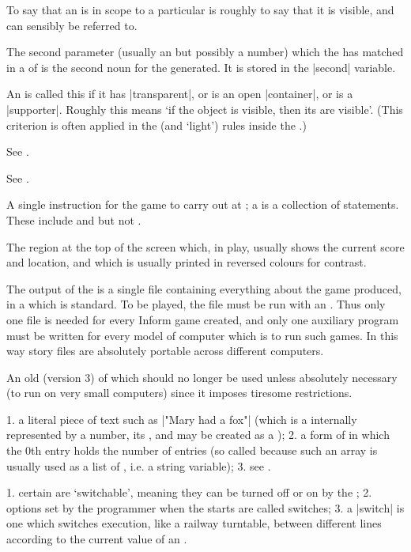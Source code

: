 {{{%
To say that an  is in scope to a particular  is
roughly to say that it is visible, and can sensibly be referred to.

%
The second parameter (usually an  but possibly a number) which the
 has matched in a  of  is the second noun for
the  generated.  It is stored in the |second| variable.

%
An  is called this if it has |transparent|, or is an open
|container|, or is a |supporter|.  Roughly this means `if the object is
visible, then its  are visible'.  (This criterion is often
applied in the  (and `light') rules inside the .)

%
See .

%
See .

%
A single instruction for the game to carry out at ; a
 is a collection of statements.  These include 
and  but not .

%
The region at the top of the screen which, in play, usually shows the
current score and location, and which is usually printed in reversed colours
for contrast.

%
The output of the  is a single file containing everything about
the game produced, in a  which is standard.  To be played, the
file must be run with an .  Thus only one file is needed for
every Inform game created, and only one auxiliary program must be written
for every model of computer which is to run such games.  In this way
story files are absolutely portable across different computers.

%
An old  (version 3) of  which should no longer be
used unless absolutely necessary (to run on very small computers) since it
imposes tiresome restrictions.

%
1. a literal piece of text such as |"Mary had a fox"| (which is a
 internally represented by a number, its ,
and may be created as a ); 2. a form of  in
which the 0th entry holds the number of entries (so called because such an
array is usually used as a list of , i.e. a string variable);
3. see .

%
1. certain  are `switchable', meaning they can be turned off or
on by the ; 2. options set by the programmer when the 
starts are called switches; 3. a |switch|  is one which
switches execution, like a railway turntable, between different lines
according to the current value of an .

}}}
